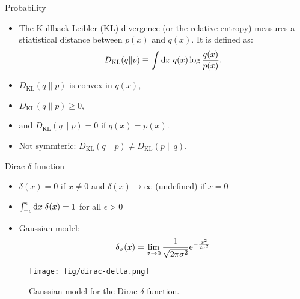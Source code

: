 \documentclass[10pt]{beamer}
\begin{document}
\begin{frame}{Probability}
\begin{itemize}
\setlength\itemsep{1em}
  \item The Kullback-Leibler (KL) divergence (or the relative entropy) measures a stiatistical distance between $p(x)$ and $q(x)$. It is defined as:
  \begin{equation}
    D_{\mathrm{KL}}(q\|p) \equiv \int\mathrm{d} x\; q(x)\log\frac{q(x)}{p(x)}.
  \end{equation}

  \item $D_{\mathrm{KL}}(q\|p)$ is convex in $q(x)$,

  \item $D_{\mathrm{KL}}(q\|p) \geq 0$,

  \item and $D_{\mathrm{KL}}(q\|p)=0$ if $q(x)=p(x)$.

  \item Not symmteric: $D_{\mathrm{KL}}(q\|p) \neq D_{\mathrm{KL}}(p\|q)$.
\end{itemize}
\end{frame}

\begin{frame}{Dirac $\delta$ function}
\begin{itemize}
\setlength\itemsep{1em}
  \item $\delta(x)=0$ if $x \neq 0$ and $\delta(x) \rightarrow \infty$ (undefined) if $x=0$
  \item $\int_{-\epsilon}^{\epsilon}\mathrm{d} x\; \delta(x) = 1$ for all $\epsilon > 0$
  \item Gaussian model:
  \begin{equation}
    \delta_\sigma(x) = \lim_{\sigma \rightarrow 0} \frac{1}{\sqrt{2\pi\sigma^2}} \mathrm{e}^{-\frac{x^2}{2\sigma^2}}
  \end{equation}
\end{itemize}
\begin{figure}
  \texttt{[image: fig/dirac-delta.png]}
  \caption{Gaussian model for the Dirac $\delta$ function.}
\end{figure}
\end{frame}
\end{document}
